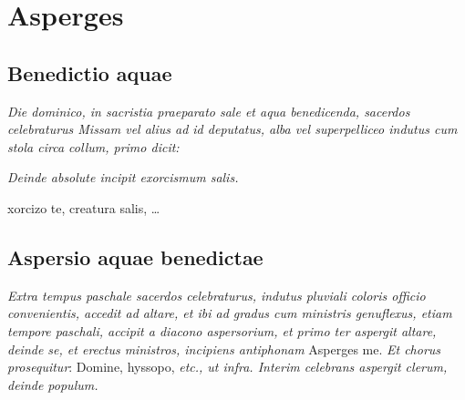 {\let\cleardoublepage\clearpage\chapter{Asperges}}

\section{Benedictio aquae}

\textit{%
    Die dominico, in sacristia praeparato sale et aqua benedicenda, sacerdos
    celebraturus Missam vel alius ad id deputatus, alba vel superpelliceo
    indutus cum stola circa collum, primo dicit:
}


{\setlength{\parskip}{0pt}
\par{}}

\textit{Deinde absolute incipit exorcismum salis.}

xorcizo te, creatura salis, \ldots

\section{Aspersio aquae benedictae}

\vspace{-0.5\baselineskip}

\textit{Extra tempus paschale sacerdos celebraturus, indutus pluviali coloris
officio convenientis, accedit ad altare, et ibi ad gradus cum ministris
genuflexus, etiam tempore paschali, accipit a diacono aspersorium, et primo ter
aspergit altare, deinde se, et erectus ministros, incipiens antiphonam} Asperges
me.  \textit{Et chorus prosequitur}: Domine, hyssopo, \textit{etc., ut infra.
Interim celebrans aspergit clerum, deinde populum.}

